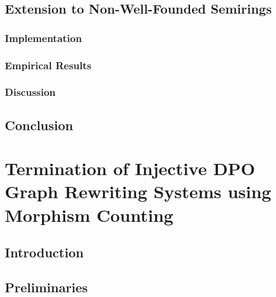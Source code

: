 \documentclass{report}
\begin{document}
     
  
\section{Extension to Non-Well-Founded Semirings}

 

\subsection{Implementation}
\label{nwf:sec:type_graph:implementation}
 

\subsection{Empirical Results}
\label{nwf:sec:type_graph:result}
 

\subsection{Discussion}
\label{nwf:sec:type_graph:related_work}


\section{Conclusion}
\label{nwf:sec:type_graph:conclusion}


\chapter{Termination of Injective DPO Graph Rewriting
Systems using Morphism Counting}
\label{chap:subgraph_counting}

\section{Introduction}
\label{subgraph_counting:sec:intro}


\section{Preliminaries} 
\label{subgraph_counting:sec:pre} 

\end{document}
